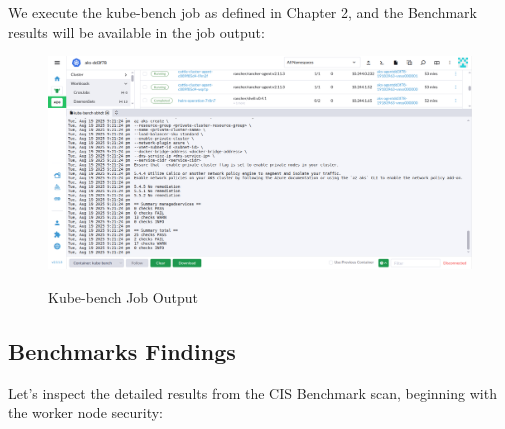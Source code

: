 We execute the kube-bench job as defined in Chapter 2, and the Benchmark results will be available in the job output:

\begin{figure}[H]
\centering
\caption {Kube-bench Job Output}
\includegraphics[width=\linewidth]{images/kube-bench-sbhdt.png}
\label{fig:kubesbhdt}
\end{figure}

\pagebreak

\subsection{Benchmarks Findings}

Let's inspect the detailed results from the CIS Benchmark scan, beginning with the worker node security:

